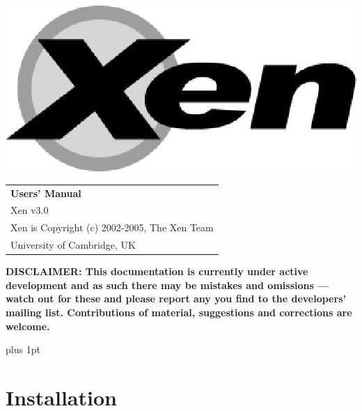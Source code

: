 \documentclass[11pt,twoside,final,openright]{report}
\begin{document}
\pagestyle{empty}
\begin{center}
\vspace*{\fill}
\includegraphics{figs/xenlogo.eps}
\vfill
\vfill
\vfill
\begin{tabular}{l}
{\Huge \bf Users' Manual} \\[4mm]
{\huge Xen v3.0} \\[80mm]

{\Large Xen is Copyright (c) 2002-2005, The Xen Team} \\[3mm]
{\Large University of Cambridge, UK} \\[20mm]
\end{tabular}
\end{center}

{\bf DISCLAIMER: This documentation is currently under active
  development and as such there may be mistakes and omissions --- watch
  out for these and please report any you find to the developers'
  mailing list. Contributions of material, suggestions and corrections
  are welcome.}

\vfill
\cleardoublepage


\pagestyle{plain}
{ \parskip 0pt plus 1pt
  \tableofcontents }
\cleardoublepage


\raggedbottom
{}
\parindent=0pt
\parskip=5pt
\renewcommand{\topfraction}{.8}
\renewcommand{\bottomfraction}{.8}
\renewcommand{\textfraction}{.2}
\renewcommand{\floatpagefraction}{.8}





\part{Installation}
\end{document}
